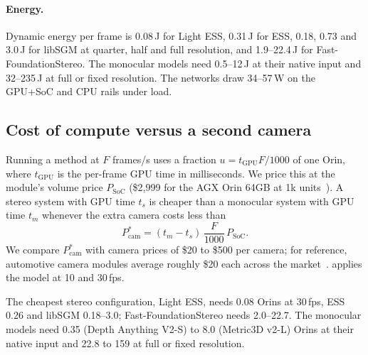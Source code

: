 \documentclass[10pt,twocolumn]{article}
\begin{document}
\paragraph{Energy.} Dynamic energy per frame is 0.08\,J for Light ESS, 0.31\,J for ESS, 0.18, 0.73 and
3.0\,J for libSGM at quarter, half and full resolution, and 1.9--22.4\,J for Fast-FoundationStereo. The
monocular models need 0.5--12\,J at their native input and 32--235\,J at full or fixed resolution. The
networks draw 34--57\,W on the GPU+SoC and CPU rails under load.

\subsection{Cost of compute versus a second camera}
\label{sec:cost}
Running a method at $F$ frames/s uses a fraction $u=t_\text{GPU}F/1000$ of one Orin, where
$t_\text{GPU}$ is the per-frame GPU time in milliseconds. We price this at the module's volume price
$P_\text{SoC}$ (\$2{,}999 for the AGX Orin 64GB at 1k units~\cite{nvidia2026jetsonprice}). A stereo
system with GPU time $t_s$ is cheaper than a monocular system with GPU time $t_m$ whenever the extra
camera costs less than
\begin{equation}
P^{*}_\text{cam} = (t_m - t_s)\,\frac{F}{1000}\,P_\text{SoC}.
\label{eq:breakeven}
\end{equation}
We compare $P^{*}_\text{cam}$ with camera prices of \$20 to \$500 per camera; for reference, automotive
camera modules average roughly \$20 each across the market~\cite{yole2025imaging}. 
applies the model at 10 and 30\,fps.

\begin{table}[t]
\centering
\caption{System cost: cameras plus the fraction of Jetson AGX Orin 64GB GPU time used (\$2{,}999 per
module). Stereo uses two cameras and monocular one. ``Orins'' above 1 require multiple modules (or a
larger GPU) for that frame rate. Break-even: the camera price below which adding the second camera
and running Light ESS, the cheapest stereo configuration, is cheaper than the
monocular model (\cref{eq:breakeven}). Monocular models with their own focal-length estimate have the
same cost as with the true one and are omitted.}
\label{tab:cost}
\small
\resizebox{\textwidth}{!}{}
\end{table}

The cheapest stereo configuration, Light ESS, needs 0.08 Orins at 30\,fps, ESS 0.26 and libSGM
0.18--3.0; Fast-FoundationStereo needs 2.0--22.7. The monocular models need 0.35 (Depth Anything V2-S)
to 8.0 (Metric3D v2-L) Orins at their native input and 22.8 to 159 at full or fixed resolution.
\end{document}
